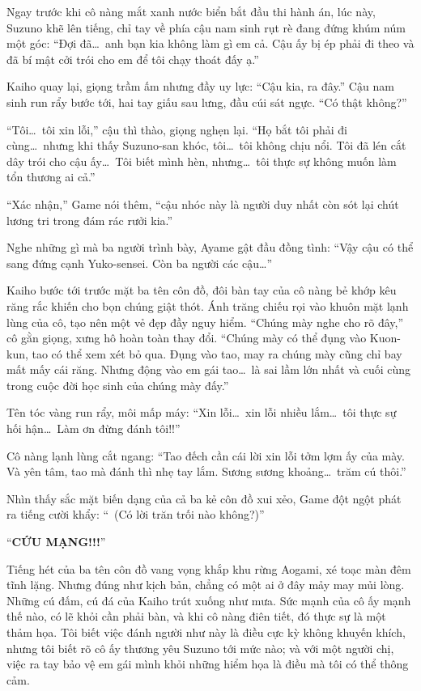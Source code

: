 \documentclass[../main.tex]{subfiles}
\begin{document}
Ngay trước khi cô nàng mắt xanh nước biển bắt đầu thi hành án, lúc này, Suzuno khẽ lên tiếng, chỉ tay về phía cậu nam sinh rụt rè đang đứng khúm núm một góc: ``Đợi đã\dots\ anh bạn kia không làm gì em cả. Cậu ấy bị ép phải đi theo và đã bí mật cởi trói cho em để tôi chạy thoát đấy ạ.''

Kaiho quay lại, giọng trầm ấm nhưng đầy uy lực: ``Cậu kia, ra đây.'' Cậu nam sinh run rẩy bước tới, hai tay giấu sau lưng, đầu cúi sát ngực. ``Có thật không?''

``Tôi\dots\ tôi xin lỗi,'' cậu thì thào, giọng nghẹn lại. ``Họ bắt tôi phải đi cùng\dots\ nhưng khi thấy Suzuno-san khóc, tôi\dots\ tôi không chịu nổi. Tôi đã lén cắt dây trói cho cậu ấy\dots\ Tôi biết mình hèn, nhưng\dots\ tôi thực sự không muốn làm tổn thương ai cả.''

``Xác nhận,'' Game nói thêm, ``cậu nhóc này là người duy nhất còn sót lại chút lương tri trong đám rác rưởi kia.''

Nghe những gì mà ba người trình bày, Ayame gật đầu đồng tình: ``Vậy cậu có thể sang đứng cạnh Yuko-sensei. Còn ba người các cậu\dots''

Kaiho bước tới trước mặt ba tên côn đồ, đôi bàn tay của cô nàng bẻ khớp kêu răng rắc khiến cho bọn chúng giật thót. Ánh trăng chiếu rọi vào khuôn mặt lạnh lùng của cô, tạo nên một vẻ đẹp đầy nguy hiểm. ``Chúng mày nghe cho rõ đây,'' cô gằn giọng, xưng hô hoàn toàn thay đổi. ``Chúng mày có thể đụng vào Kuon-kun, tao có thể xem xét bỏ qua. Đụng vào tao, may ra chúng mày cũng chỉ bay mất mấy cái răng. Nhưng động vào em gái tao\dots\ là sai lầm lớn nhất và cuối cùng trong cuộc đời học sinh của chúng mày đấy.''

Tên tóc vàng run rẩy, môi mấp máy: ``Xin lỗi\dots\ xin lỗi nhiều lắm\dots\ tôi thực sự hối hận\dots\ Làm ơn đừng đánh tôi!!''

Cô nàng lạnh lùng cắt ngang: ``Tao đếch cần cái lời xin lỗi tởm lợm ấy của mày. Và yên tâm, tao mà đánh thì nhẹ tay lắm. Sương sương khoảng\dots\ trăm cú thôi.''

Nhìn thấy sắc mặt biến dạng của cả ba kẻ côn đồ xui xẻo, Game đột ngột phát ra tiếng cười khẩy: ``\ (Có lời trăn trối nào không?)''

``{\Large\textbf{CỨU MẠNG!!!}}''

Tiếng hét của ba tên côn đồ vang vọng khắp khu rừng Aogami, xé toạc màn đêm tĩnh lặng. Nhưng đúng như kịch bản, chẳng có một ai ở đây mảy may mủi lòng. Những cú đấm, cú đá của Kaiho trút xuống như mưa. Sức mạnh của cô ấy mạnh thế nào, có lẽ khỏi cần phải bàn, và khi cô nàng điên tiết, đó thực sự là một thảm họa. Tôi biết việc đánh người như này là điều cực kỳ không khuyến khích, nhưng tôi biết rõ cô ấy thương yêu Suzuno tới mức nào; và với một người chị, việc ra tay bảo vệ em gái mình khỏi những hiểm họa là điều mà tôi có thể thông cảm.
\end{document}
